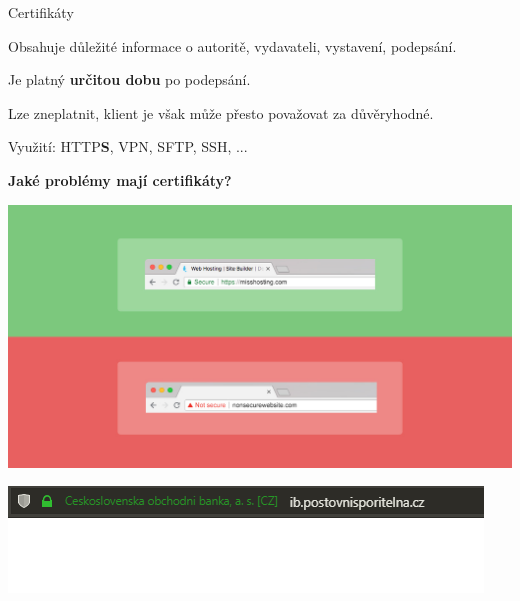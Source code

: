 \documentclass[aspectratio=169]{beamer}
\begin{document}
\begin{frame}{Certifikáty}
    \begin{cardTiny}
        \begin{flushleft}
            Obsahuje důležité informace o autoritě, vydavateli, vystavení, podepsání.

            Je platný \textbf{určitou dobu} po podepsání.

            Lze zneplatnit, klient je však může přesto považovat za důvěryhodné.
            \vspace{2ex}

            Využití: HTTP\textbf{S}, VPN, SFTP, SSH, ...
        \end{flushleft}
    \end{cardTiny}

    \begin{cardTiny}
        \begin{center}
            \textbf{Jaké problémy mají certifikáty?}
        \end{center}
    \end{cardTiny}
\end{frame}

\begin{frame}
    \includegraphics[width=\textwidth]{img/secure.jpg}
\end{frame}

\begin{frame}
    \includegraphics[width=\textwidth]{img/ps.png}
\end{frame}
\end{document}
